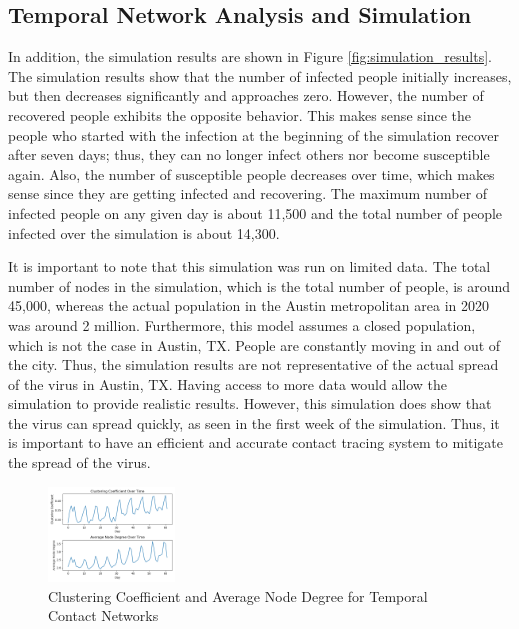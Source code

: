 \documentclass[times, 10pt,twocolumn]{article}
\begin{document}
\subsection{Temporal Network Analysis and Simulation} 

In addition, the simulation results are shown in Figure \ref{fig:simulation_results}. The simulation results show that the number of infected people initially increases, but then decreases significantly and approaches zero. However, the number of recovered people exhibits the opposite behavior. This makes sense since the people who started with the infection at the beginning of the simulation recover after seven days; thus, they can no longer infect others nor become susceptible again. Also, the number of susceptible people decreases over time, which makes sense since they are getting infected and recovering. The maximum number of infected people on any given day is about 11,500 and the total number of people infected over the simulation is about 14,300.

It is important to note that this simulation was run on limited data. The total number of nodes in the simulation, which is the total number of people, is around 45,000, whereas the actual population in the Austin metropolitan area in 2020 was around 2 million. Furthermore, this model assumes a closed population, which is not the case in Austin, TX. People are constantly moving in and out of the city. Thus, the simulation results are not representative of the actual spread of the virus in Austin, TX.  Having access to more data would allow the simulation to provide realistic results. However, this simulation does show that the virus can spread quickly, as seen in the first week of the simulation. Thus, it is important to have an efficient and accurate contact tracing system to mitigate the spread of the virus.

\begin{figure}[h]
    \centering
    \includegraphics[width=0.3\textwidth]{imgs/temporal_network_analysis.png}
    \caption{Clustering Coefficient and Average Node Degree for Temporal Contact Networks} 
    \label{fig:temporal_stats}
\end{figure}
\end{document}

